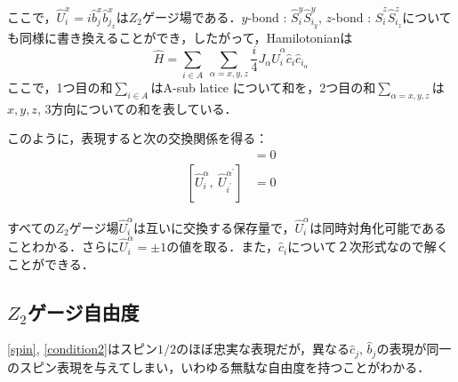 \documentclass[dvipdfmx,autodetect-engine]{jsarticle}
\newcommand{\nn}{\notag \\}
\begin{document}
ここで，$\hat{U}_i^x = i\hat{b}^{x}_j\hat{b}^{x}_{j_x}$は$Z_2$ゲージ場である．$y$-bond : $\hat{S}_{i}^{y}\hat{S}_{i_y}^{y}$, $z$-bond : $\hat{S}_{i}^{z}\hat{S}_{i_z}^{z}$についても同様に書き換えることができ，したがって，Hamilotonianは
\begin{equation}
    \hat{H} = \sum_{i\in A}\ \sum_{\alpha=x,y,z}
    \frac{i}{4}J_{\alpha}\hat{U}_{i}^{\alpha}\hat{c}_i\hat{c}_{i_{\alpha}}
\end{equation}
ここで，1つ目の和$\sum_{i\in A}$はA-sub latice について和を，2つ目の和$\sum_{\alpha=x,y,z}$は$x,y,z$, 3方向についての和を表している．

このように，表現すると次の交換関係を得る：
\begin{align}
    [\hat{U}_{i}^{\alpha},\ \hat{H}] &= 0\\[10pt]
    [\hat{U}_{i}^{\alpha},\ \hat{U}_{i^{\prime}}^{\alpha^{\prime}}] &= 0
\end{align}

すべての$Z_2$ゲージ場$\hat{U}_i^{\alpha}$は互いに交換する保存量で，$\hat{U}_i^{\alpha}$は同時対角化可能であることわかる．さらに$\hat{U}_i^{\alpha}=\pm1$の値を取る．また，$\hat{c}_i$について２次形式なので解くことができる．

\subsection{$Z_2$ゲージ自由度}
\eqref{spin}, \eqref{condition2}はスピン$1/2$のほぼ忠実な表現だが，異なる$\hat{c}_j$, $\hat{b}_j$の表現が同一のスピン表現を与えてしまい，いわゆる無駄な自由度を持つことがわかる．
\end{document}
